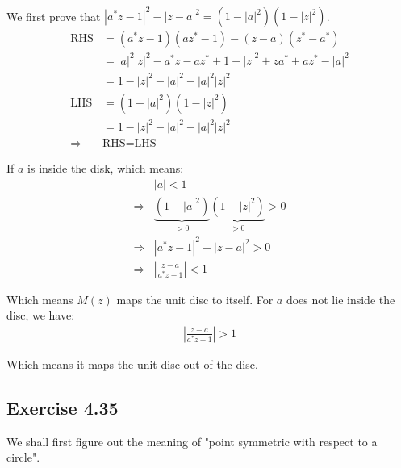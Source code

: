 \documentclass[]{ctexart}
\begin{document}
		\subsubsection{}
			We first prove that $|a^*z-1|^2-|z-a|^2=(1-|a|^2)(1-|z|^2)$.
				\begin{equation*}
				\begin{aligned}
					\text{RHS}&=(a^*z-1)(az^*-1)-(z-a)(z^*-a^*)\\
					&=|a|^2|z|^2-a^*z-az^*+1-|z|^2+za^*+az^*-|a|^2\\
					&=1-|z|^2-|a|^2-|a|^2|z|^2\\
					\text{LHS}&=(1-|a|^2)(1-|z|^2)\\
					&=1-|z|^2-|a|^2-|a|^2|z|^2\\
					\Rightarrow &\text{RHS}=\text{LHS}
				\end{aligned}
				\end{equation*}
			
			If $a$ is inside the disk, which means:
				\begin{equation*}
				\begin{aligned}
					&|a|<1\\
					\Rightarrow &\underbrace{(1-|a|^2)}_{>0}\underbrace{(1-|z|^2)}_{>0}>0\\
					\Rightarrow &|a^*z-1|^2-|z-a|^2>0\\
					\Rightarrow &\left|\frac{z-a}{a^*z-1}\right|<1
				\end{aligned}
				\end{equation*}
			
			Which means $ M(z) $ maps the unit disc to itself. For $a$ does  not lie inside the disc, we have:
				\begin{equation*}
				\begin{aligned}
					\left|\frac{z-a}{a^*z-1}\right|>1
				\end{aligned}
				\end{equation*}
			
			Which means it maps the unit disc out of the disc. 
	
	\subsection{Exercise 4.35}
		We shall first figure out the meaning of "point symmetric with respect to a circle". 
		
\end{document}
